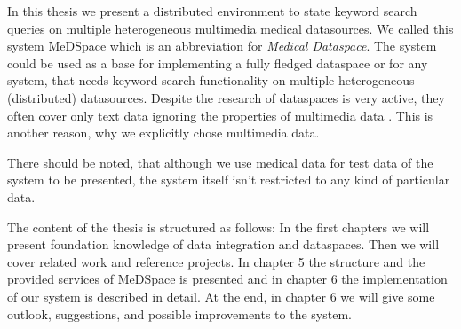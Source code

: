 
In this thesis we present a distributed environment to state keyword search queries on multiple heterogeneous multimedia medical datasources. We called this system MeDSpace which is an abbreviation for \emph{Medical Dataspace}. The system could be used as a base for implementing a fully fledged dataspace or for any system, that needs keyword search functionality on multiple heterogeneous (distributed) datasources. Despite the research of dataspaces is very active, they often cover only text data ignoring the properties of multimedia data \cite{6167826}. This is another reason, why we explicitly chose multimedia data.

There should be noted, that although we use medical data for test data of the system to be presented, the system itself isn't restricted to any kind of particular data.

The content of the thesis is structured as follows: In the first chapters we will present foundation knowledge of data integration and dataspaces. Then we will cover related work and reference projects. In chapter 5 the structure and the provided services of MeDSpace is presented and in chapter 6 the implementation of our system is described in detail. At the end, in chapter 6 we will give some outlook, suggestions, and possible improvements to the system. 
